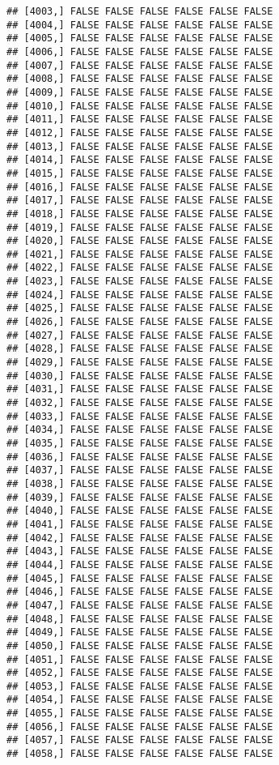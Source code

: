 \documentclass[
]{article}
\begin{document}
\begin{verbatim}
## [4003,] FALSE FALSE FALSE FALSE FALSE FALSE
## [4004,] FALSE FALSE FALSE FALSE FALSE FALSE
## [4005,] FALSE FALSE FALSE FALSE FALSE FALSE
## [4006,] FALSE FALSE FALSE FALSE FALSE FALSE
## [4007,] FALSE FALSE FALSE FALSE FALSE FALSE
## [4008,] FALSE FALSE FALSE FALSE FALSE FALSE
## [4009,] FALSE FALSE FALSE FALSE FALSE FALSE
## [4010,] FALSE FALSE FALSE FALSE FALSE FALSE
## [4011,] FALSE FALSE FALSE FALSE FALSE FALSE
## [4012,] FALSE FALSE FALSE FALSE FALSE FALSE
## [4013,] FALSE FALSE FALSE FALSE FALSE FALSE
## [4014,] FALSE FALSE FALSE FALSE FALSE FALSE
## [4015,] FALSE FALSE FALSE FALSE FALSE FALSE
## [4016,] FALSE FALSE FALSE FALSE FALSE FALSE
## [4017,] FALSE FALSE FALSE FALSE FALSE FALSE
## [4018,] FALSE FALSE FALSE FALSE FALSE FALSE
## [4019,] FALSE FALSE FALSE FALSE FALSE FALSE
## [4020,] FALSE FALSE FALSE FALSE FALSE FALSE
## [4021,] FALSE FALSE FALSE FALSE FALSE FALSE
## [4022,] FALSE FALSE FALSE FALSE FALSE FALSE
## [4023,] FALSE FALSE FALSE FALSE FALSE FALSE
## [4024,] FALSE FALSE FALSE FALSE FALSE FALSE
## [4025,] FALSE FALSE FALSE FALSE FALSE FALSE
## [4026,] FALSE FALSE FALSE FALSE FALSE FALSE
## [4027,] FALSE FALSE FALSE FALSE FALSE FALSE
## [4028,] FALSE FALSE FALSE FALSE FALSE FALSE
## [4029,] FALSE FALSE FALSE FALSE FALSE FALSE
## [4030,] FALSE FALSE FALSE FALSE FALSE FALSE
## [4031,] FALSE FALSE FALSE FALSE FALSE FALSE
## [4032,] FALSE FALSE FALSE FALSE FALSE FALSE
## [4033,] FALSE FALSE FALSE FALSE FALSE FALSE
## [4034,] FALSE FALSE FALSE FALSE FALSE FALSE
## [4035,] FALSE FALSE FALSE FALSE FALSE FALSE
## [4036,] FALSE FALSE FALSE FALSE FALSE FALSE
## [4037,] FALSE FALSE FALSE FALSE FALSE FALSE
## [4038,] FALSE FALSE FALSE FALSE FALSE FALSE
## [4039,] FALSE FALSE FALSE FALSE FALSE FALSE
## [4040,] FALSE FALSE FALSE FALSE FALSE FALSE
## [4041,] FALSE FALSE FALSE FALSE FALSE FALSE
## [4042,] FALSE FALSE FALSE FALSE FALSE FALSE
## [4043,] FALSE FALSE FALSE FALSE FALSE FALSE
## [4044,] FALSE FALSE FALSE FALSE FALSE FALSE
## [4045,] FALSE FALSE FALSE FALSE FALSE FALSE
## [4046,] FALSE FALSE FALSE FALSE FALSE FALSE
## [4047,] FALSE FALSE FALSE FALSE FALSE FALSE
## [4048,] FALSE FALSE FALSE FALSE FALSE FALSE
## [4049,] FALSE FALSE FALSE FALSE FALSE FALSE
## [4050,] FALSE FALSE FALSE FALSE FALSE FALSE
## [4051,] FALSE FALSE FALSE FALSE FALSE FALSE
## [4052,] FALSE FALSE FALSE FALSE FALSE FALSE
## [4053,] FALSE FALSE FALSE FALSE FALSE FALSE
## [4054,] FALSE FALSE FALSE FALSE FALSE FALSE
## [4055,] FALSE FALSE FALSE FALSE FALSE FALSE
## [4056,] FALSE FALSE FALSE FALSE FALSE FALSE
## [4057,] FALSE FALSE FALSE FALSE FALSE FALSE
## [4058,] FALSE FALSE FALSE FALSE FALSE FALSE

\end{verbatim}
\end{document}

